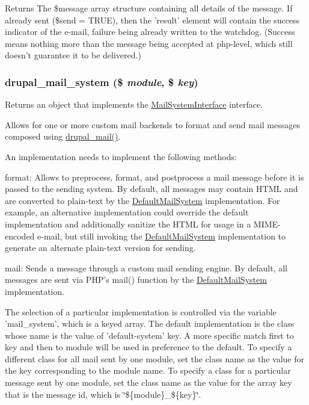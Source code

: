 \begin{DoxyReturn}{Returns}
The \$message array structure containing all details of the message. If already sent (\$send = TRUE), then the 'result' element will contain the success indicator of the e-\/mail, failure being already written to the watchdog. (Success means nothing more than the message being accepted at php-\/level, which still doesn't guarantee it to be delivered.) 
\end{DoxyReturn}
\hypertarget{mail_8inc_a6ba240b2e368447935c9bcb114f59a1a}{
\subsubsection[{drupal\_\-mail\_\-system}]{\setlength{\rightskip}{0pt plus 5cm}drupal\_\-mail\_\-system (\$ {\em module}, \/  \$ {\em key})}}
\label{mail_8inc_a6ba240b2e368447935c9bcb114f59a1a}
Returns an object that implements the \hyperlink{interfaceMailSystemInterface}{MailSystemInterface} interface.

Allows for one or more custom mail backends to format and send mail messages composed using \hyperlink{mail_8inc_ab80781fd7273975a77cbbd13300eddbf}{drupal\_\-mail()}.

An implementation needs to implement the following methods:
\begin{DoxyItemize}
\item format: Allows to preprocess, format, and postprocess a mail message before it is passed to the sending system. By default, all messages may contain HTML and are converted to plain-\/text by the \hyperlink{classDefaultMailSystem}{DefaultMailSystem} implementation. For example, an alternative implementation could override the default implementation and additionally sanitize the HTML for usage in a MIME-\/encoded e-\/mail, but still invoking the \hyperlink{classDefaultMailSystem}{DefaultMailSystem} implementation to generate an alternate plain-\/text version for sending.
\item mail: Sends a message through a custom mail sending engine. By default, all messages are sent via PHP's mail() function by the \hyperlink{classDefaultMailSystem}{DefaultMailSystem} implementation.
\end{DoxyItemize}

The selection of a particular implementation is controlled via the variable 'mail\_\-system', which is a keyed array. The default implementation is the class whose name is the value of 'default-\/system' key. A more specific match first to key and then to module will be used in preference to the default. To specify a different class for all mail sent by one module, set the class name as the value for the key corresponding to the module name. To specify a class for a particular message sent by one module, set the class name as the value for the array key that is the message id, which is \char`\"{}\$\{module\}\_\-\$\{key\}\char`\"{}.

